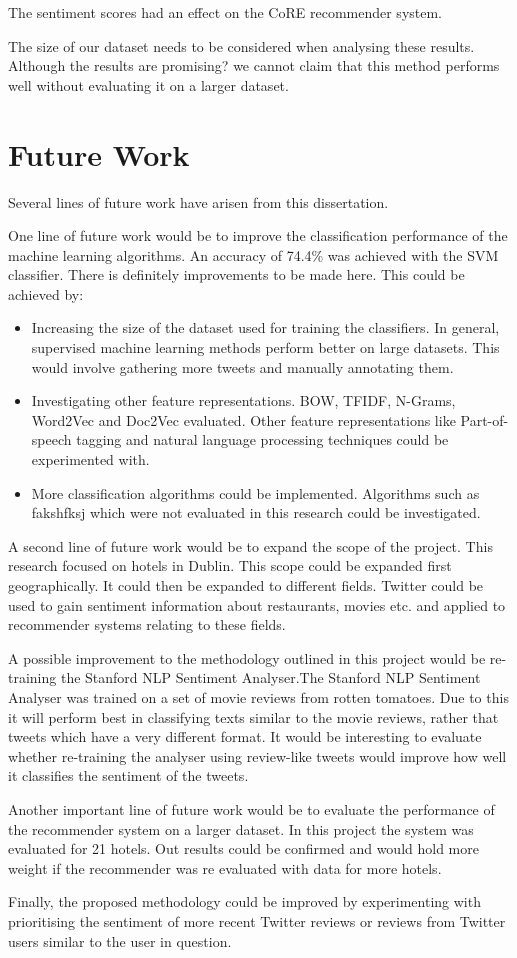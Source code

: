 The sentiment scores had an effect on the CoRE recommender system.

The size of our dataset needs to be considered when analysing these results. Although the results are promising? we cannot claim that this method performs well without evaluating it on a larger dataset. 


\section{Future Work}

Several lines of future work have arisen from this dissertation.

One line of future work would be to improve the classification performance of the machine learning algorithms. An accuracy of 74.4\% was achieved with the SVM classifier. There is definitely improvements to be made here. This could be achieved by:
\begin{itemize}
    \item Increasing the size of the dataset used for training the classifiers. In general, supervised machine learning methods perform better on large datasets. This would involve gathering more tweets and manually annotating them.
    \item Investigating other feature representations. BOW, TFIDF, N-Grams, Word2Vec and Doc2Vec evaluated. Other feature representations like Part-of-speech tagging and natural language processing techniques could be experimented with.
    \item More classification algorithms could be implemented. Algorithms such as fakshfksj which were not evaluated in this research could be investigated. 
\end{itemize}

A second line of future work would be to expand the scope of the project. This research focused on hotels in Dublin. This scope could be expanded first geographically. It could then be expanded to different fields. Twitter could be used to gain sentiment information about restaurants, movies etc. and applied to recommender systems relating to these fields.

A possible improvement to the methodology outlined in this project would be re-training the Stanford NLP Sentiment Analyser.The Stanford NLP Sentiment Analyser was trained on a set of movie reviews from rotten tomatoes. Due to this it will perform best in classifying texts similar to the movie reviews, rather that tweets which have a very different format. It would be interesting to evaluate whether re-training the analyser using review-like tweets would improve how well it classifies the sentiment of the tweets. 

Another important line of future work would be to evaluate the performance of the recommender system on a larger dataset. In this project the system was evaluated for 21 hotels. Out results could be confirmed and would hold more weight if the recommender was re evaluated with data for more hotels.

Finally, the proposed methodology could be improved by experimenting with prioritising the sentiment of more recent Twitter reviews or reviews from Twitter users similar to the user in question.
